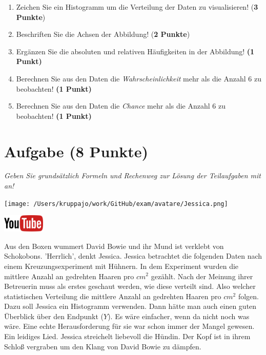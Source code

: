 \documentclass[a4paper, 9pt]{scrartcl}\usepackage[]{graphicx}\usepackage[]{xcolor}
\begin{document}
\begin{enumerate}
\item Zeichen Sie ein Histogramm um die Verteilung der Daten zu visualisieren! (\textbf{3 Punkte})
\item Beschriften Sie die Achsen der Abbildung! (\textbf{2 Punkte})
\item Ergänzen Sie die absoluten und relativen Häufigkeiten in der
  Abbildung! \textbf{(1 Punkt)}
\item Berechnen Sie aus den Daten die \textit{Wahrscheinlichkeit}
  mehr als die Anzahl 6 zu beobachten! \textbf{(1
    Punkt)}
\item Berechnen Sie aus den Daten die \textit{Chance} mehr
  als die Anzahl 6 zu beobachten! \textbf{(1 Punkt)}
\end{enumerate}

 
\clearpage

\section{Aufgabe \hfill (8 Punkte)}

\textit{Geben Sie grundsätzlich Formeln und Rechenweg zur Lösung der Teilaufgaben mit an!} \\[1Ex]
 

 
\begin{minipage}[t]{0.5\textwidth}
\texttt{[image: /Users/kruppajo/work/GitHub/exam/avatare/Jessica.png]}
\end{minipage}
\begin{minipage}[t]{0.5\textwidth}
\hfill
\href{https://youtu.be/ORHSPTCdfeY}{\includegraphics[width = 2cm]{img/youtube}}\\[1Ex]
\end{minipage}
\vspace{1ex}



Aus den Boxen wummert David Bowie und ihr Mund ist verklebt von Schokobons. 'Herrlich', denkt Jessica. Jessica betrachtet die folgenden Daten nach einem Kreuzungsexperiment mit Hühnern. In dem Experiment wurden die mittlere Anzahl an gedrehten Haaren pro $cm^2$ gezählt. Nach der Meinung ihrer Betreuerin muss als erstes geschaut werden, wie diese verteilt sind. Also welcher statistischen Verteilung die mittlere Anzahl an gedrehten Haaren pro $cm^2$ folgen. Dazu soll Jessica ein Histogramm verwenden. Dann hätte man auch einen guten Überblick über den Endpunkt ($Y$). Es wäre einfacher, wenn da nicht noch was wäre. Eine echte Herausforderung für sie war schon immer der Mangel gewesen. Ein leidiges Lied. Jessica streichelt liebevoll die Hündin. Der Kopf ist in ihrem Schloß vergraben um den Klang von David Bowie zu dämpfen.
\end{document}
